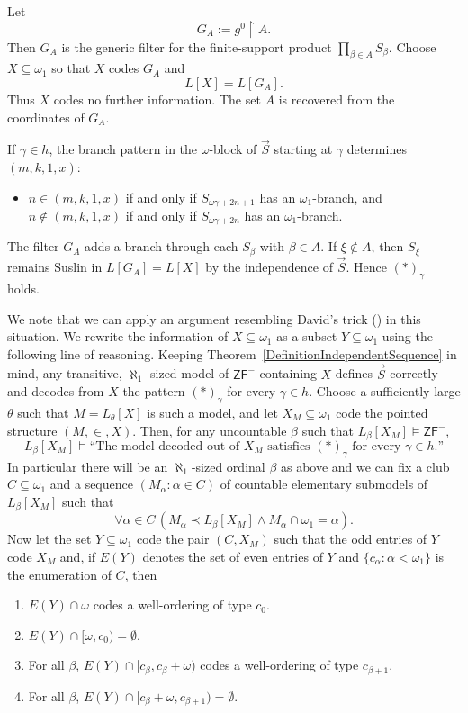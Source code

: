 \documentclass[a4paper,11pt]{article}
\newcommand{\ZFP}{\mathsf{ZF}^-}
\begin{document}
     Let
     \[
     G_A:=g^0\upharpoonright A.
     \]
     Then $G_A$ is the generic filter for the finite-support product $\prod_{\beta\in A}S_\beta$. Choose $X\subseteq\omega_1$ so that $X$ codes $G_A$ and
     \[
     L[X]=L[G_A].
     \]
     Thus $X$ codes no further information. The set $A$ is recovered from the coordinates of $G_A$.

     If $\gamma\in h$, the branch pattern in the $\omega$-block of $\vec S$ starting at $\gamma$ determines $(m,k,1,x)$:
     \begin{itemize}
     \item[$(\ast)_\gamma$] $n\in(m,k,1,x)$ if and only if $S_{\omega\gamma+2n+1}$ has an $\omega_1$-branch, and $n\notin(m,k,1,x)$ if and only if $S_{\omega\gamma+2n}$ has an $\omega_1$-branch.
     \end{itemize}
     The filter $G_A$ adds a branch through each $S_\beta$ with $\beta\in A$. If $\xi\notin A$, then $S_\xi$ remains Suslin in $L[G_A]=L[X]$ by the independence of $\vec S$. Hence $(\ast)_\gamma$ holds.

     We note that we can apply an argument resembling David's trick (\cite{David}) in this situation. We rewrite the information of $X\subseteq\omega_1$ as a subset $Y\subseteq\omega_1$ using the following line of reasoning. Keeping Theorem~\ref{DefinitionIndependentSequence} in mind, any transitive, $\aleph_1$-sized model of $\ZFP$ containing $X$ defines $\vec S$ correctly and decodes from $X$ the pattern $(\ast)_\gamma$ for every $\gamma\in h$. Choose a sufficiently large $\theta$ such that $M=L_\theta[X]$ is such a model, and let $X_M\subseteq\omega_1$ code the pointed structure $(M,\in,X)$. Then, for any uncountable $\beta$ such that $L_\beta[X_M]\models\ZFP$,
     \[
     L_\beta[X_M]\models\text{``The model decoded out of $X_M$ satisfies $(\ast)_\gamma$ for every $\gamma\in h$.''}
     \]
     In particular there will be an $\aleph_1$-sized ordinal $\beta$ as above and we can fix a club $C\subseteq\omega_1$ and a sequence $(M_\alpha:\alpha\in C)$ of countable elementary submodels of $L_\beta[X_M]$ such that
     \[
     \forall\alpha\in C\,(M_\alpha\prec L_\beta[X_M]\land M_\alpha\cap\omega_1=\alpha).
     \]
     Now let the set $Y\subseteq\omega_1$ code the pair $(C,X_M)$ such that the odd entries of $Y$ code $X_M$ and, if $E(Y)$ denotes the set of even entries of $Y$ and $\{c_\alpha:\alpha<\omega_1\}$ is the enumeration of $C$, then
     \begin{enumerate}
     \item $E(Y)\cap\omega$ codes a well-ordering of type $c_0$.
     \item $E(Y)\cap[\omega,c_0)=\emptyset$.
     \item For all $\beta$, $E(Y)\cap[c_\beta,c_\beta+\omega)$ codes a well-ordering of type $c_{\beta+1}$.
     \item For all $\beta$, $E(Y)\cap[c_\beta+\omega,c_{\beta+1})=\emptyset$.
     \end{enumerate}
\end{document}
